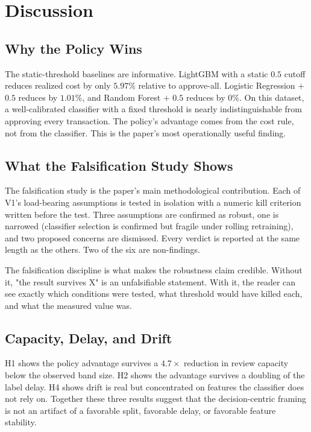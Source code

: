 \documentclass[conference]{IEEEtran}
\begin{document}
\section{Discussion}
\label{sec:discussion}

\subsection{Why the Policy Wins}

The static-threshold baselines are informative. LightGBM with a static
$0.5$ cutoff reduces realized cost by only $5.97\%$ relative to
approve-all. Logistic Regression $+$ $0.5$ reduces by $1.01\%$, and Random
Forest $+$ $0.5$ reduces by $0\%$. On this dataset, a well-calibrated
classifier with a fixed threshold is nearly indistinguishable from
approving every transaction. The policy's advantage comes from the cost
rule, not from the classifier. This is the paper's most operationally
useful finding.

\subsection{What the Falsification Study Shows}

The falsification study is the paper's main methodological contribution.
Each of V1's load-bearing assumptions is tested in isolation with a numeric
kill criterion written before the test. Three assumptions are confirmed as
robust, one is narrowed (classifier selection is confirmed but fragile under
rolling retraining), and two proposed concerns are dismissed. Every verdict
is reported at the same length as the others. Two of the six are
non-findings.

The falsification discipline is what makes the robustness claim credible.
Without it, "the result survives X" is an unfalsifiable statement. With it,
the reader can see exactly which conditions were tested, what threshold
would have killed each, and what the measured value was.

\subsection{Capacity, Delay, and Drift}

H1 shows the policy advantage survives a $4.7\times$ reduction in review
capacity below the observed band size. H2 shows the advantage survives a
doubling of the label delay. H4 shows drift is real but concentrated on
features the classifier does not rely on. Together these three results
suggest that the decision-centric framing is not an artifact of a favorable
split, favorable delay, or favorable feature stability.
\end{document}

